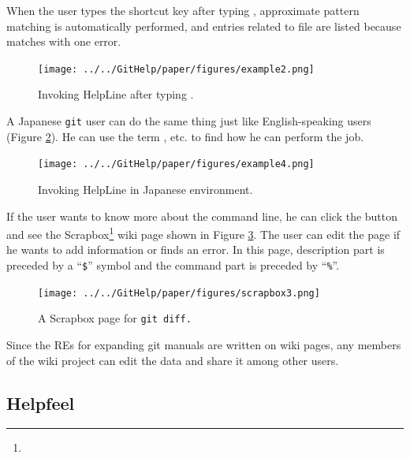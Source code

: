 \documentclass[manuscript,anonymous,review]{acmart}
\def\HL{\textsf{HelpLine}}
\def\GIT{\texttt{git}}
\def\ES{\textsf{ExpandSearch}}
\def\SB{\textsf{Scrapbox}}
\begin{document}
When the user types the shortcut key
after typing ,
approximate pattern matching is automatically performed, and
entries related to  file are listed because
 matches  with one error.

\begin{figure}[H]
  \texttt{[image: ../../GitHelp/paper/figures/example2.png]}
  \caption{Invoking {\HL} after typing .}
  \label{example2}
\end{figure}

A Japanese {\GIT} user can do the same thing just like
English-speaking users (Figure \ref{example3}).
He can use the term , etc. to find how he can perform the job.

\begin{figure}[H]
  \texttt{[image: ../../GitHelp/paper/figures/example4.png]}
  \caption{Invoking {\HL} in Japanese environment.}
  \label{example3}
\end{figure}

If the user wants to know more about the command line,
he can click the
button and see the {\SB}\footnote{
} wiki page shown in Figure \ref{scrapboxpage}.
The user can edit the page if he wants to add information or finds an error.
In this page, description part is preceded by a ``\texttt{\$}'' symbol and
the command part is preceded by ``\texttt{\%}''.

\begin{figure}[H]
  \centerline{\texttt{[image: ../../GitHelp/paper/figures/scrapbox3.png]}}
  \caption{A {\SB} page for \tt{git diff}.}
  \label{scrapboxpage}
\end{figure}

Since the REs for expanding git manuals are written on wiki pages,
any members of the wiki project can edit the data and share it among other users.

% 

\subsection{Helpfeel}
\end{document}
